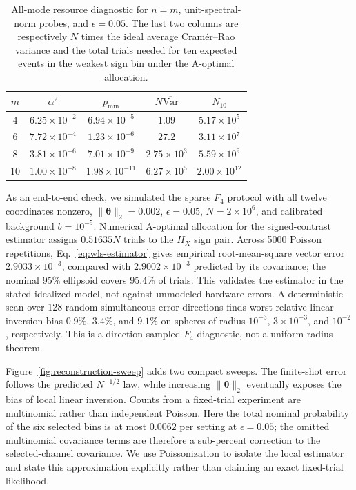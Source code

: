 \documentclass[aps,pra,reprint,amsmath,amssymb,superscriptaddress,longbibliography]{revtex4-2}
\newcommand{\btheta}{\bm{\theta}}
\begin{document}
\begin{table}[t]
\caption{All-mode resource diagnostic for $n=m$, unit-spectral-norm probes,
and $\epsilon=0.05$.  The last two columns are respectively $N$ times the
ideal average Cramér--Rao variance and the total trials needed for ten
expected events in the weakest sign bin under the A-optimal allocation.}
\label{tab:resource-scaling}
\begin{ruledtabular}
\begin{tabular}{ccccc}
$m$&$\alpha^2$&$p_{\min}$&$N\overline{\mathrm{Var}}$&$N_{10}$\\
\hline
4&$6.25{\times}10^{-2}$&$6.94{\times}10^{-5}$&$1.09$&$5.17{\times}10^5$\\
6&$7.72{\times}10^{-4}$&$1.23{\times}10^{-6}$&$27.2$&$3.11{\times}10^7$\\
8&$3.81{\times}10^{-6}$&$7.01{\times}10^{-9}$&$2.75{\times}10^3$&$5.59{\times}10^9$\\
10&$1.00{\times}10^{-8}$&$1.98{\times}10^{-11}$&$6.27{\times}10^5$&$2.00{\times}10^{12}$
\end{tabular}
\end{ruledtabular}
\end{table}

As an end-to-end check, we simulated the sparse $F_4$ protocol with all
twelve coordinates nonzero, $\|\btheta\|_2=0.002$, $\epsilon=0.05$,
$N=2\times10^6$, and calibrated background $b=10^{-5}$.  Numerical
A-optimal allocation for the signed-contrast estimator assigns
$0.51635N$ trials to the $H_X$ sign pair.
Across 5000 Poisson repetitions, Eq.~\eqref{eq:wls-estimator} gives
empirical root-mean-square vector error $2.9033\times10^{-3}$, compared with
$2.9002\times10^{-3}$ predicted by its covariance; the nominal 95\%
ellipsoid covers 95.4\% of trials.  This validates the estimator in the
stated idealized model, not against unmodeled hardware errors.  A
deterministic scan over 128 random simultaneous-error directions finds
worst relative linear-inversion bias $0.9\%$, $3.4\%$, and $9.1\%$ on
spheres of radius $10^{-3}$, $3\times10^{-3}$, and $10^{-2}$,
respectively.  This is a direction-sampled $F_4$ diagnostic, not a uniform
radius theorem.

Figure~\ref{fig:reconstruction-sweep} adds two compact sweeps.  The
finite-shot error follows the predicted $N^{-1/2}$ law, while increasing
$\|\btheta\|_2$ eventually exposes the bias of local linear inversion.
Counts from a fixed-trial experiment are multinomial rather than
independent Poisson.  Here the total nominal probability of the six selected
bins is at most $0.0062$ per setting at $\epsilon=0.05$; the omitted
multinomial covariance terms are therefore a sub-percent correction to the
selected-channel covariance.  We use Poissonization to isolate the local
estimator and state this approximation explicitly rather than claiming an
exact fixed-trial likelihood.
\end{document}
